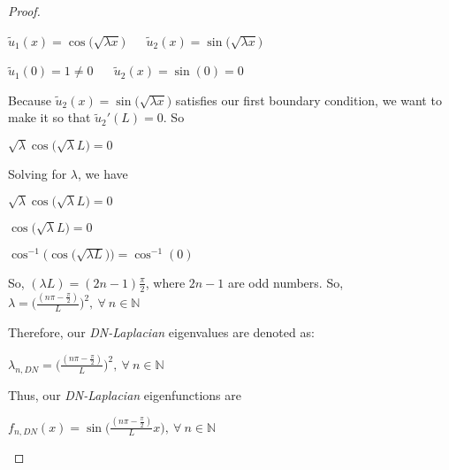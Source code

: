 \documentclass[executivepaper]{article}
\begin{document}
\begin{flushleft}
\begin{proof}
\begin{center}
$\tilde{u}_{1}(x)=\cos\bigg(\sqrt{\lambda x}\bigg)$ $\quad$ $\tilde{u}_{2}(x)=\sin\bigg(\sqrt{\lambda x}\bigg)$

\vspace{2mm}

$\tilde{u}_{1}(0)=1 \neq 0$ $\quad$ $\tilde{u}_{2}(x)=\sin(0)=0$

\end{center}

Because  $\tilde{u}_{2}(x)=\sin\bigg(\sqrt{\lambda x}\bigg)$ satisfies our first boundary condition, we want to make it so that $\tilde{u}_{2}'(L)=0$. So

\begin{center}

$\sqrt{\lambda} \cos\bigg(\sqrt{\lambda} L\bigg)=0$

\end{center}

Solving for $\lambda$, we have

\begin{center}

$\sqrt{\lambda} \cos\bigg(\sqrt{\lambda} L\bigg)=0$

\vspace{2mm}

$\cos\bigg(\sqrt{\lambda} L\bigg)=0$

\vspace{2mm}

$\cos^{-1}\Bigg(\cos\bigg(\sqrt{\lambda L}\bigg)\Bigg)=\cos^{-1}(0)$

\end{center}

So, $(\lambda L)=(2n-1)\frac{\pi}{2}$, where $2n-1$ are odd numbers. So, $\lambda=\bigg(\frac{(n \pi - \frac{\pi}{2})}{L}\bigg)^2,  ~ \forall ~ n \in \mathbb{N}$

Therefore, our \textit{DN-Laplacian} eigenvalues are denoted as:

\begin{center}

$\lambda_{n, DN}=\bigg(\frac{(n \pi - \frac{\pi}{2})}{L}\bigg)^2, ~ \forall ~ n \in \mathbb{N}$

\end{center}

Thus, our \textit{DN-Laplacian} eigenfunctions are

\begin{center}

$f_{n,DN}(x)=\sin\bigg(\frac{(n \pi - \frac{\pi}{2})}{L} x\bigg), ~ \forall ~ n \in \mathbb{N}$

\end{center}

\end{proof}

\end{flushleft}
\end{document}
